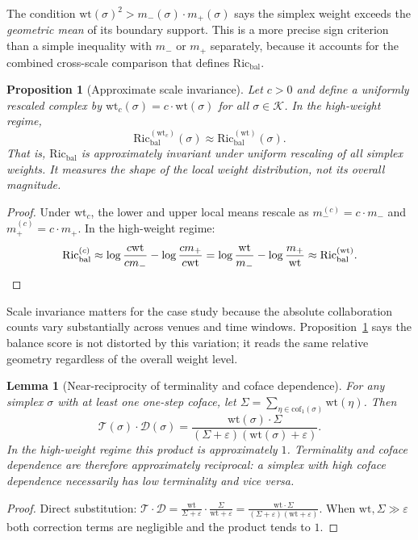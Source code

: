 \documentclass[11pt]{article}
\newtheorem{proposition}[definition]{Proposition}
\newtheorem{lemma}[definition]{Lemma}
\newcommand{\eps}{\varepsilon}
\newcommand{\K}{\mathcal{K}}
\newcommand{\wt}{\mathrm{wt}}
\newcommand{\Ric}{\mathrm{Ric}}
\newcommand{\cof}{\mathrm{cof}}
\begin{document}
The condition $\wt(\sigma)^2 > m_-(\sigma)\cdot m_+(\sigma)$ says the simplex weight exceeds the \emph{geometric mean} of its boundary support. This is a more precise sign criterion than a simple inequality with $m_-$ or $m_+$ separately, because it accounts for the combined cross-scale comparison that defines $\Ric_{\mathrm{bal}}$.

\begin{proposition}[Approximate scale invariance]
\label{prop:scale}
Let $c>0$ and define a uniformly rescaled complex by $\wt_c(\sigma)=c\cdot\wt(\sigma)$ for all $\sigma\in\K$. In the high-weight regime,
\[
\Ric_{\mathrm{bal}}^{(\wt_c)}(\sigma)\approx\Ric_{\mathrm{bal}}^{(\wt)}(\sigma).
\]
That is, $\Ric_{\mathrm{bal}}$ is approximately invariant under uniform rescaling of all simplex weights. It measures the shape of the local weight distribution, not its overall magnitude.
\end{proposition}

\begin{proof}
Under $\wt_c$, the lower and upper local means rescale as $m_-^{(c)}=c\cdot m_-$ and $m_+^{(c)}=c\cdot m_+$. In the high-weight regime:
\[
\Ric_{\mathrm{bal}}^{(c)}
\approx\log\frac{c\wt}{c m_-}-\log\frac{c m_+}{c\wt}
=\log\frac{\wt}{m_-}-\log\frac{m_+}{\wt}
\approx\Ric_{\mathrm{bal}}^{(\wt)}.\qedhere
\]
\end{proof}

Scale invariance matters for the case study because the absolute collaboration counts vary substantially across venues and time windows. Proposition~\ref{prop:scale} says the balance score is not distorted by this variation; it reads the same relative geometry regardless of the overall weight level.

\begin{lemma}[Near-reciprocity of terminality and coface dependence]
\label{lem:reciprocal}
For any simplex $\sigma$ with at least one one-step coface, let $\Sigma=\sum_{\eta\in\cof_1(\sigma)}\wt(\eta)$. Then
\[
\mathcal{T}(\sigma)\cdot\mathcal{D}(\sigma)
=\frac{\wt(\sigma)\cdot\Sigma}{(\Sigma+\eps)(\wt(\sigma)+\eps)}.
\]
In the high-weight regime this product is approximately $1$. Terminality and coface dependence are therefore approximately reciprocal: a simplex with high coface dependence necessarily has low terminality and vice versa.
\end{lemma}

\begin{proof}
Direct substitution:
$\mathcal{T}\cdot\mathcal{D}=\frac{\wt}{\Sigma+\eps}\cdot\frac{\Sigma}{\wt+\eps}=\frac{\wt\cdot\Sigma}{(\Sigma+\eps)(\wt+\eps)}$.
When $\wt,\Sigma\gg\eps$ both correction terms are negligible and the product tends to $1$.
\end{proof}
\end{document}
